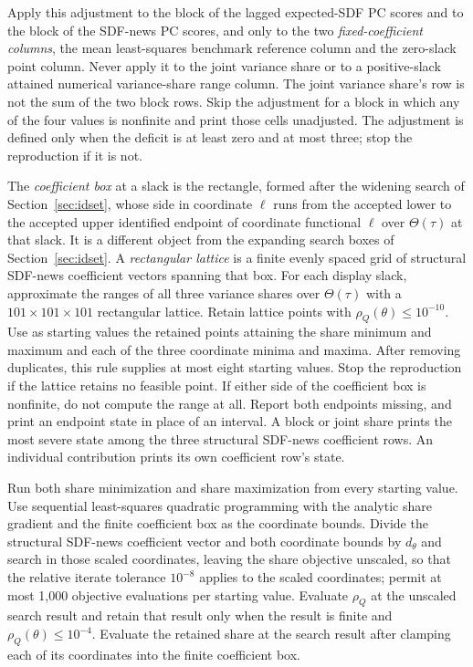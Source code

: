\documentclass[11pt]{article}
\begin{document}
Apply this adjustment to the block of the lagged expected-SDF PC scores and to the block of the
SDF-news PC scores, and only to the two \emph{fixed-coefficient columns}, the mean least-squares benchmark reference
column and the zero-slack point column. Never apply it to the joint variance share or to a positive-slack attained numerical
variance-share range column. The joint variance share's row is not the sum of the two block rows. Skip the adjustment
for a block in which any of the four values is nonfinite and print those cells unadjusted.
The adjustment is defined only when the deficit is at least zero and at most three; stop the
reproduction if it is not.

The \emph{coefficient box} at a slack is the rectangle, formed after the widening search of
Section~\ref{sec:idset}, whose side in coordinate \(\ell\) runs from the accepted lower to the
accepted upper identified endpoint of coordinate functional \(\ell\) over \(\Theta(\tau)\) at that
slack. It is a different object from the expanding search boxes of Section~\ref{sec:idset}. A
\emph{rectangular lattice} is a finite evenly spaced grid of structural SDF-news coefficient vectors
spanning that box. For each display slack, approximate the ranges of all three variance shares over
\(\Theta(\tau)\) with a \(101\times101\times101\) rectangular lattice. Retain lattice points with \(\rho_Q(\theta)\le10^{-10}\). Use as
starting values the retained points attaining the share minimum and maximum and each of the three
coordinate minima and maxima. After removing duplicates, this rule supplies at most eight starting
values. Stop the reproduction if the lattice retains no feasible point. If either side of the coefficient box is nonfinite, do not compute the range at all. Report both endpoints missing, and
print an endpoint state in place of an interval. A block or joint share prints the most severe state
among the three structural SDF-news coefficient rows. An individual contribution prints its own
coefficient row's state.

Run both share minimization and share maximization from every starting value. Use sequential
least-squares quadratic programming with the analytic share gradient and the finite coefficient box as
the coordinate bounds. Divide the structural SDF-news coefficient vector and both coordinate bounds by
\(d_\theta\) and search in those scaled coordinates, leaving the share objective unscaled, so that the
relative iterate tolerance \(10^{-8}\) applies to the scaled coordinates; permit at most 1,000
objective evaluations per starting value. Evaluate \(\rho_Q\) at the unscaled search result and
retain that result only when the result is finite and \(\rho_Q(\theta)\le10^{-4}\). Evaluate the
retained share at the search result after clamping each of its coordinates into the finite coefficient
box.
\end{document}
